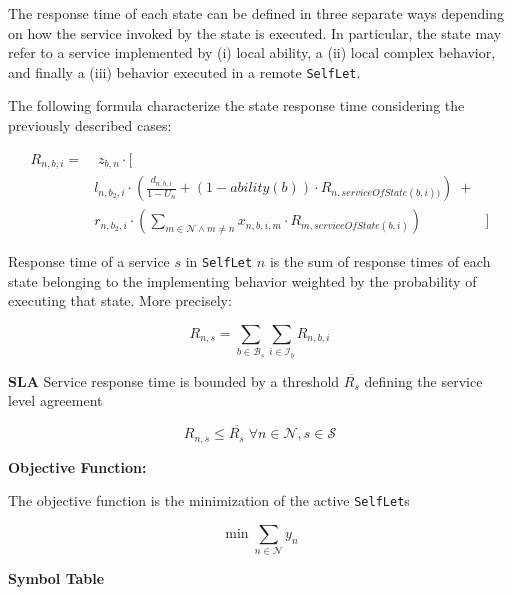 \documentclass[11pt]{amsart}
\newcommand{\slet}{\texttt{SelfLet}}
\newcommand{\moreslet}{\texttt{SelfLet}s}
\begin{document}
The response time of each state can be defined in three separate ways depending on how the service invoked by the state is executed. In particular, the state may refer to a service implemented by (i) local ability, a (ii) local complex behavior, and finally a (iii) behavior executed in a remote \slet{}.

The following formula characterize the state response time considering the previously described cases:

$$
\begin{align}
	R_{n,b,i}  = & \;  z_{b,n}  \cdot  [  \\
	& l_{n,b_2,i} \cdot ( \frac{d_{n,b,i}}{1 - U_n}  +  (1 - ability(b)) \cdot R_{n, serviceOfState(b,i))}) \; + \\
	& r_{n,b_2,i} \cdot (\sum_{m \in \mathcal{N} \wedge m \neq n} x_{n,b,i,m} \cdot R_{m,serviceOfState(b,i)} )
	& ]
\end{align}
$$

Response time of a service $s$ in \slet{} $n$ is the sum of response times of each state belonging to the implementing behavior weighted by the probability of executing that state. More precisely:

$$
	R_{n,s} = \sum_{b \in \mathcal{B}_s} \sum_{i \in \mathcal{I}_b} R_{n,b,i}
$$

{\bf SLA}
Service response time is bounded by a threshold $\overline{R_s}$ defining the service level agreement 

$$
	R_{n,s} \leq \overline{R_s} \; \forall n \in \mathcal{N}, s \in \mathcal{S}
$$


{\bf Objective Function:}

The objective function is the minimization of the active \moreslet{}

$$
\min \sum_{n \in \mathcal{N}} y_n
$$


{\bf Symbol Table}
\end{document}
